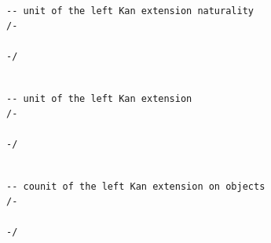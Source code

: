 \documentclass{book}
\theoremstyle{definition}
\newcounter{lcounter}
\begin{document}
{{%
\begin{center}
\begin{tcolorbox}[width=5in,colback={white},title={\begin{center}\texttt{Lean \thelcounter} \addtocounter{lcounter}{1}  \end{center}},colbacktitle=Blue,coltitle=black]
\begin{verbatim}

-- unit of the left Kan extension naturality
/-

-/

\end{verbatim}
\end{tcolorbox}
\end{center}

\begin{center}
\begin{tcolorbox}[width=5in,colback={white},title={\begin{center}\texttt{Lean \thelcounter} \addtocounter{lcounter}{1}  \end{center}},colbacktitle=Blue,coltitle=black]
\begin{verbatim}

-- unit of the left Kan extension
/-

-/

\end{verbatim}
\end{tcolorbox}
\end{center}

\begin{center}
\begin{tcolorbox}[width=5in,colback={white},title={\begin{center}\texttt{Lean \thelcounter} \addtocounter{lcounter}{1}  \end{center}},colbacktitle=Blue,coltitle=black]
\begin{verbatim}

-- counit of the left Kan extension on objects
/-

-/

\end{verbatim}
\end{tcolorbox}
\end{center}



}}
\end{document}
